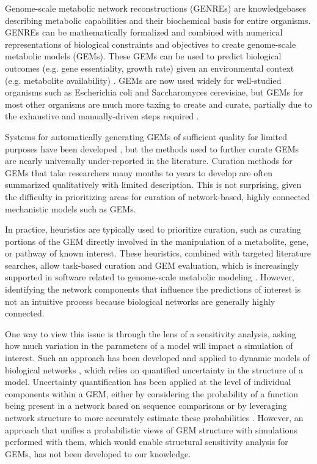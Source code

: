 \documentclass[11pt,twocolumn,notitlepage,openany,twoside]{book}
\begin{document}
\begin{refsection}
Genome-scale metabolic network reconstructions (GENREs) are knowledgebases describing metabolic capabilities and their biochemical basis for entire organisms. GENREs can be mathematically formalized and combined with numerical representations of biological constraints and objectives to create genome-scale metabolic models (GEMs). These GEMs can be used to predict biological outcomes (e.g. gene essentiality, growth rate) given an environmental context (e.g. metabolite availability) \cite{Oberhardt2009-iu}. GEMs are now used widely for well-studied organisms such as Escherichia coli and Saccharomyces cerevisiae, but GEMs for most other organisms are much more taxing to create and curate, partially due to the exhaustive and manually-driven steps required \cite{Thiele2010-yq}.

Systems for automatically generating GEMs of sufficient quality for limited purposes have been developed \cite{Henry2010-um}, but the methods used to further curate GEMs are nearly universally under-reported in the literature. Curation methods for GEMs that take researchers many months to years to develop are often summarized qualitatively with limited description. This is not surprising, given the difficulty in prioritizing areas for curation of network-based, highly connected mechanistic models such as GEMs.

In practice, heuristics are typically used to prioritize curation, such as curating portions of the GEM directly involved in the manipulation of a metabolite, gene, or pathway of known interest. These heuristics, combined with targeted literature searches, allow task-based curation and GEM evaluation, which is increasingly supported in software related to genome-scale metabolic modeling \cite{Lieven2018-fo, Wang2018-yn}. However, identifying the network components that influence the predictions of interest is not an intuitive process because biological networks are generally highly connected.

One way to view this issue is through the lens of a sensitivity analysis, asking how much variation in the parameters of a model will impact a simulation of interest. Such an approach has been developed and applied to dynamic models of biological networks \cite{Babtie2014-vy}, which relies on quantified uncertainty in the structure of a model. Uncertainty quantification has been applied at the level of individual components within a GEM, either by considering the probability of a function being present in a network based on sequence comparisons \cite{Benedict2014-yo} or by leveraging network structure to more accurately estimate these probabilities \cite{Plata2012-ys}. However, an approach that unifies a probabilistic views of GEM structure with simulations performed with them, which would enable structural sensitivity analysis for GEMs, has not been developed to our knowledge.


\end{refsection}
\end{document}

